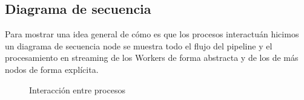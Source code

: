 \subsection{Diagrama de secuencia}
Para mostrar una idea general de cómo es que los procesos interactuán hicimos un diagrama de secuencia node se muestra todo el flujo del pipeline y el procesamiento en streaming de los Workers de forma abstracta y de los de más nodos de forma explícita.
\begin{figure}[H]
    \centering
    
    \caption{Interacción entre procesos}
    \label{fig:secuencia}
\end{figure}




